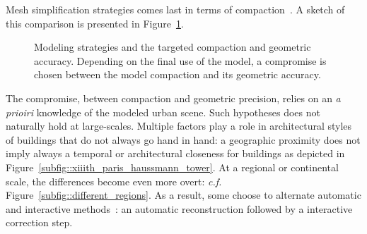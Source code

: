             Mesh simplification strategies comes last in terms of compaction~\parencite{verdie2015lod, zhou20102}.
            A sketch of this comparison is presented in Figure~\ref{fig::modeling_strategies}.\\
            \begin{figure}[htpb]
                \centering
                            
                \caption{
                    \label{fig::modeling_strategies} Modeling strategies and the targeted compaction and geometric accuracy.
                    Depending on the final use of the model, a compromise is chosen between the model compaction and its geometric accuracy.
                }
            \end{figure}
            The compromise, between compaction and geometric precision, relies on an \textit{a prioiri} knowledge of the modeled urban scene.
            Such hypotheses does not naturally hold at large-scales.
            Multiple factors play a role in architectural styles of buildings that do not always go hand in hand:
            a geographic proximity does not imply always a temporal or architectural closeness for buildings as depicted in Figure~\ref{subfig::xiiith_paris_haussmann_tower}.
            At a regional or continental scale, the differences become even more overt: \textit{c.f.} Figure~\ref{subfig::different_regions}.
            As a result, some choose to alternate automatic and interactive methods~\parencite{musialski2013survey}: an automatic reconstruction followed by a interactive correction step.
            \begin{figure}[htpb]
            \end{figure}
        

